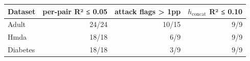 \begin{tabular}{lrrr}
\toprule
Dataset & per-pair R² ≤ 0.05 & attack flags > 1pp & $h_{\mathrm{concat}}$ R² ≤ 0.10 \\
\midrule
Adult & 24/24 & 10/15 & 9/9 \\
Hmda & 18/18 & 6/9 & 9/9 \\
Diabetes & 18/18 & 3/9 & 9/9 \\
\bottomrule
\end{tabular}
